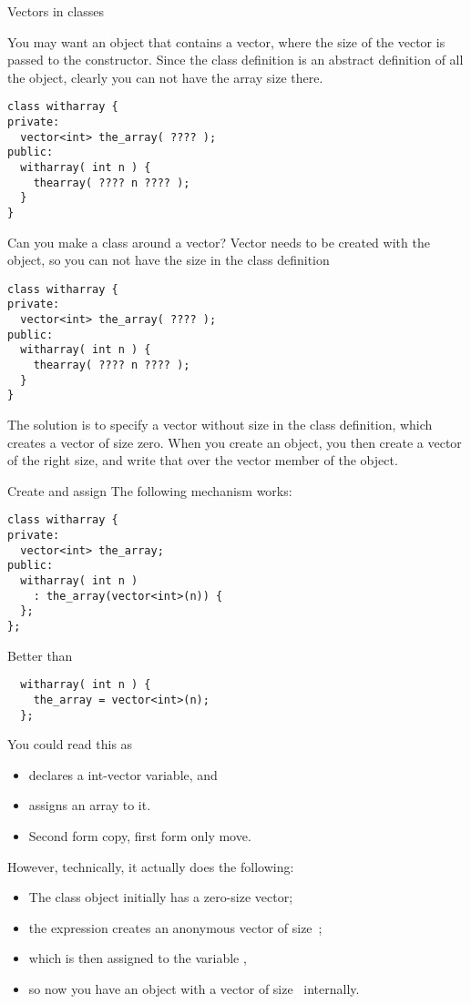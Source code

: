  {Vectors in classes}

You may want an object that contains a vector, where the size of the
vector is passed to the constructor. Since the class definition is an
abstract definition of all the object, clearly you can not have the
array size there.

\begin{verbatim}
class witharray {
private:
  vector<int> the_array( ???? );
public:
  witharray( int n ) {
    thearray( ???? n ???? );
  }
}
\end{verbatim}

\begin{slide}{Can you make a class around a vector?}
  \label{sl:class-with-vector}
  Vector needs to be created with the object, so you can not have the
  size in the class definition
\begin{verbatim}
class witharray {
private:
  vector<int> the_array( ???? );
public:
  witharray( int n ) {
    thearray( ???? n ???? );
  }
}
\end{verbatim}
\end{slide}

The solution is to specify a vector without size in the class
definition, which creates a vector of size zero. When you create an
object, you then create a vector of the right size, and write that
over the vector member of the object.

\begin{block}{Create and assign}
  \label{sl:class-has-vector}
  The following mechanism works:
\begin{verbatim}
class witharray {
private:
  vector<int> the_array;
public:
  witharray( int n )
    : the_array(vector<int>(n)) {
  };
};
\end{verbatim}
Better than
\begin{verbatim}
  witharray( int n ) {
    the_array = vector<int>(n);
  };
\end{verbatim}
\end{block}

You could read this as
\begin{itemize}
\item {} declares a int-vector variable, and
\item {} assigns an array to it.
\item Second form copy, first form only move.
\end{itemize}
However, 
technically, it actually does the following:
\begin{itemize}
\item The class object initially has a zero-size vector;
\item the expression  creates an anonymous vector
  of size~;
\item which is then assigned to the variable ,
\item so now you have an object with a vector of size~ internally.
\end{itemize}

